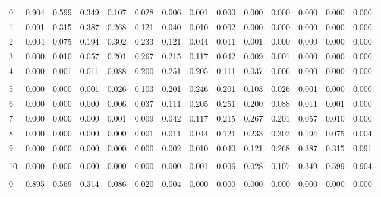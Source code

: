 \documentclass[
]{article}
\begin{document}
\begin{longtable}[t]{lrrrrrrrrrrrrr}
\hspace{1em}0 & 0.904 & 0.599 & 0.349 & 0.107 & 0.028 & 0.006 & 0.001 & 0.000 & 0.000 & 0.000 & 0.000 & 0.000 & 0.000\\
\hspace{1em}1 & 0.091 & 0.315 & 0.387 & 0.268 & 0.121 & 0.040 & 0.010 & 0.002 & 0.000 & 0.000 & 0.000 & 0.000 & 0.000\\
\hspace{1em}2 & 0.004 & 0.075 & 0.194 & 0.302 & 0.233 & 0.121 & 0.044 & 0.011 & 0.001 & 0.000 & 0.000 & 0.000 & 0.000\\
\hspace{1em}3 & 0.000 & 0.010 & 0.057 & 0.201 & 0.267 & 0.215 & 0.117 & 0.042 & 0.009 & 0.001 & 0.000 & 0.000 & 0.000\\
\hspace{1em}4 & 0.000 & 0.001 & 0.011 & 0.088 & 0.200 & 0.251 & 0.205 & 0.111 & 0.037 & 0.006 & 0.000 & 0.000 & 0.000\\
\addlinespace[-.7em]
\multicolumn{14}{l}{ }\\
\hspace{1em}5 & 0.000 & 0.000 & 0.001 & 0.026 & 0.103 & 0.201 & 0.246 & 0.201 & 0.103 & 0.026 & 0.001 & 0.000 & 0.000\\
\hspace{1em}6 & 0.000 & 0.000 & 0.000 & 0.006 & 0.037 & 0.111 & 0.205 & 0.251 & 0.200 & 0.088 & 0.011 & 0.001 & 0.000\\
\hspace{1em}7 & 0.000 & 0.000 & 0.000 & 0.001 & 0.009 & 0.042 & 0.117 & 0.215 & 0.267 & 0.201 & 0.057 & 0.010 & 0.000\\
\hspace{1em}8 & 0.000 & 0.000 & 0.000 & 0.000 & 0.001 & 0.011 & 0.044 & 0.121 & 0.233 & 0.302 & 0.194 & 0.075 & 0.004\\
\hspace{1em}9 & 0.000 & 0.000 & 0.000 & 0.000 & 0.000 & 0.002 & 0.010 & 0.040 & 0.121 & 0.268 & 0.387 & 0.315 & 0.091\\
\addlinespace[-.7em]
\multicolumn{14}{l}{ }\\
\hspace{1em}10 & 0.000 & 0.000 & 0.000 & 0.000 & 0.000 & 0.000 & 0.001 & 0.006 & 0.028 & 0.107 & 0.349 & 0.599 & 0.904\\
\addlinespace[0.3em]
\multicolumn{14}{l}{$n=11$}\\
\hspace{1em}0 & 0.895 & 0.569 & 0.314 & 0.086 & 0.020 & 0.004 & 0.000 & 0.000 & 0.000 & 0.000 & 0.000 & 0.000 & 0.000\\

\end{longtable}
\end{document}
